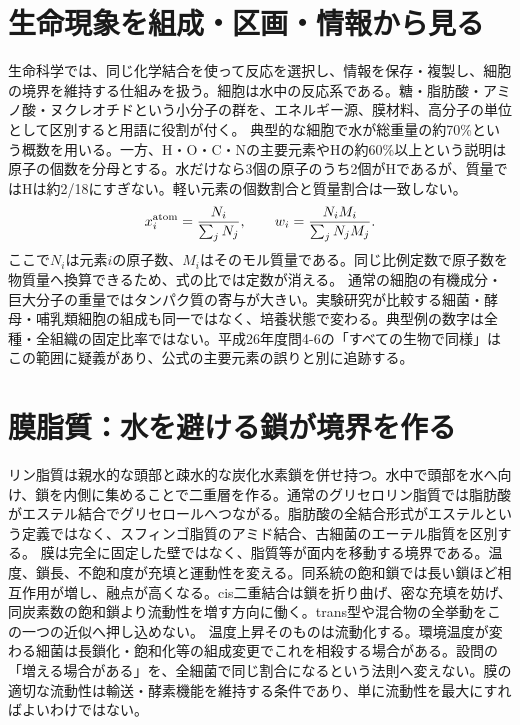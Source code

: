 \section{生命現象を組成・区画・情報から見る}
\label{theory:biology:composition}
生命科学では、同じ化学結合を使って反応を選択し、情報を保存・複製し、細胞の境界を維持する仕組みを扱う。細胞は水中の反応系である。糖・脂肪酸・アミノ酸・ヌクレオチドという小分子の群を、エネルギー源、膜材料、高分子の単位として区別すると用語に役割が付く。
典型的な細胞で水が総重量の約70\%という概数を用いる。一方、H・O・C・Nの主要元素やHの約60\%以上という説明は原子の個数を分母とする。水だけなら3個の原子のうち2個がHであるが、質量ではHは約2/18にすぎない。軽い元素の個数割合と質量割合は一致しない。
\begin{equation}
 x_i^{\rm atom}=\frac{N_i}{\sum_jN_j},\qquad
 w_i=\frac{N_i M_i}{\sum_jN_jM_j}.
\end{equation}
ここで\(N_i\)は元素\(i\)の原子数、\(M_i\)はそのモル質量である。同じ比例定数で原子数を物質量へ換算できるため、式の比では定数が消える。
通常の細胞の有機成分・巨大分子の重量ではタンパク質の寄与が大きい。実験研究が比較する細菌・酵母・哺乳類細胞の組成も同一ではなく、培養状態で変わる\autocite{bio_cell_mass}。典型例の数字は全種・全組織の固定比率ではない。平成26年度問4-6の「すべての生物で同様」はこの範囲に疑義があり、公式の主要元素の誤りと別に追跡する。

\section{膜脂質：水を避ける鎖が境界を作る}
\label{theory:biology:membrane}
リン脂質は親水的な頭部と疎水的な炭化水素鎖を併せ持つ。水中で頭部を水へ向け、鎖を内側に集めることで二重層を作る。通常のグリセロリン脂質では脂肪酸がエステル結合でグリセロールへつながる。脂肪酸の全結合形式がエステルという定義ではなく、スフィンゴ脂質のアミド結合、古細菌のエーテル脂質を区別する。
膜は完全に固定した壁ではなく、脂質等が面内を移動する境界である。温度、鎖長、不飽和度が充填と運動性を変える。同系統の飽和鎖では長い鎖ほど相互作用が増し、融点が高くなる。cis二重結合は鎖を折り曲げ、密な充填を妨げ、同炭素数の飽和鎖より流動性を増す方向に働く\autocite{bio_membrane}。trans型や混合物の全挙動をこの一つの近似へ押し込めない。
温度上昇そのものは流動化する。環境温度が変わる細菌は長鎖化・飽和化等の組成変更でこれを相殺する場合がある。設問の「増える場合がある」を、全細菌で同じ割合になるという法則へ変えない。膜の適切な流動性は輸送・酵素機能を維持する条件であり、単に流動性を最大にすればよいわけではない。


